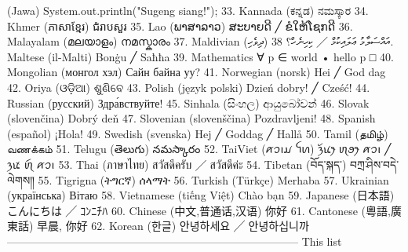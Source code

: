 \documentclass[11pt]{article}
\begin{document}
(Jawa)	System.out.println("Sugeng siang!"); 33. Kannada (ಕನ್ನಡ)	ನಮಸ್ಕಾರ 34. Khmer (ភាសាខ្មែរ)	ជំរាបសួរ 35. Lao (ພາສາລາວ)	ສະບາຍດີ ╱ ຂໍໃຫ້ໂຊກດີ 36. Malayalam (മലയാളം)	നമസ്കാരം 37. Maldivian (ދިވެހި)	އައްސަލާމު ޢަލައިކުމް ╱ ކިހިނެހް؟ 38. Maltese (il-Malti)	Bonġu ╱ Saħħa 39. Mathematics	∀ p ∈ world • hello p \quad □ 40. Mongolian (монгол хэл)	Сайн байна уу? 41. Norwegian (norsk)	Hei ╱ God dag 42. Oriya (ଓଡ଼ିଆ)	ଶୁଣିବେ 43. Polish \quad (język polski)	Dzień dobry! ╱ Cześć! 44. Russian (русский)	Здра́вствуйте! 45. Sinhala (සිංහල)	ආයුබෝවන් 46. Slovak (slovenčina)	Dobrý deň 47. Slovenian (slovenščina)	Pozdravljeni! 48. Spanish (español)	¡Hola! 49. Swedish (svenska)	Hej ╱ Goddag ╱ Hallå \newline{\color{white}.}50. Tamil (தமிழ்)	வணக்கம் 51. Telugu (తెలుగు)	నమస్కారం 52. TaiViet (ꪁꪫꪱꪣ ꪼꪕ)	ꪅꪰꪙꫂ ꪨꪮꫂ ꪁꪫꪱ ╱ ꪅꪽ ꪨꪷ ꪁꪫꪱ 53. Thai (ภาษาไทย)	สวัสดีครับ ╱ สวัสดีค่ะ 54. Tibetan (བོད་སྐད་)	བཀྲ་ཤིས་བདེ་ལེགས༎ \newline{\color{white}.}55. Tigrigna (ትግርኛ)	ሰላማት 56. Turkish (Türkçe)	Merhaba 57. Ukrainian (українська)	Вітаю 58. Vietnamese (tiếng Việt)	Chào bạn 59. Japanese (日本語)	こんにちは ╱ ｺﾝﾆﾁﾊ 60. Chinese (中文,普通话,汉语)	你好 61. Cantonese (粵語,廣東話)	早晨, 你好 62. Korean (한글)	안녕하세요 ╱ 안녕하십니까 -------------------------------------------------------------------------------- This list 
\end{document}
